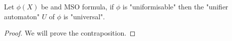 \documentclass{article}
\begin{document}
\begin{lemma}
	Let $\phi(X)$ be and MSO formula, if $\phi$ is "uniformisable" then the "unifier automaton" $U$ of $\phi$ is "universal".
\end{lemma}

\begin{proof}
	We will prove the contraposition.
	\todo{~}
\end{proof}



\iffalse
	
	
\fi
\end{document}
